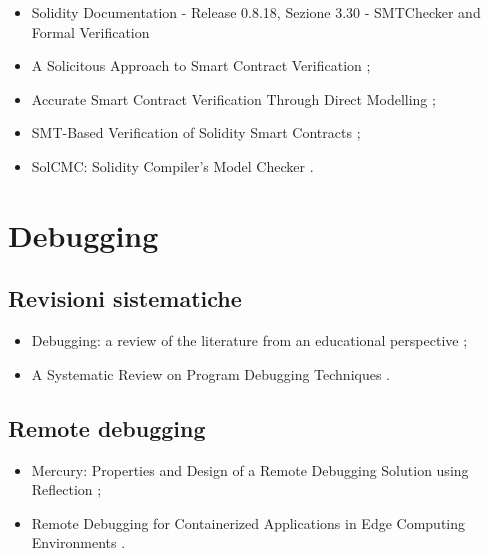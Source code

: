 \begin{itemize}

\item Solidity Documentation - Release 0.8.18, Sezione 3.30 - SMTChecker and Formal Verification \cite{solidity0.8.18smtchecker}

\item A Solicitous Approach to Smart Contract Verification \cite{otoni2023smtchecker};

\item Accurate Smart Contract Verification Through Direct Modelling \cite{marescotti2020smtchecker};

\item SMT-Based Verification of Solidity Smart Contracts \cite{alt2018smtchecker};

\item SolCMC: Solidity Compiler's Model Checker \cite{alt2022smtchecker}.

\end{itemize}

\section*{Debugging}

\subsection*{Revisioni sistematiche}
\begin{itemize}

\item Debugging: a review of the literature from an educational perspective \cite{mccauley2008debugreview};

\item A Systematic Review on Program Debugging Techniques \cite{ghosh2019debugreview}.

\end{itemize}

\subsection*{Remote debugging}
\begin{itemize}

\item Mercury: Properties and Design of a Remote Debugging Solution using Reflection \cite{papoulias2015remotedebug};

\item Remote Debugging for Containerized Applications in Edge Computing Environments \cite{ozcan2019remotedebug}.

\end{itemize}

